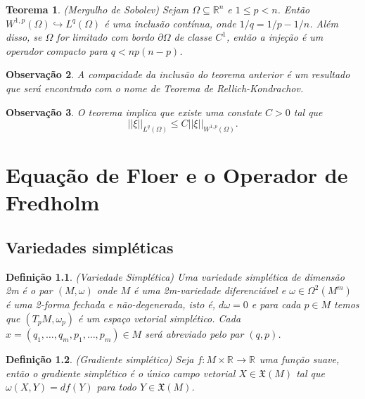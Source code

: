 \documentclass[12pt]{book}
\newtheorem{teorema}{Teorema}[section]
\newtheorem{definicao}[teorema]{Definição}
\newtheorem{observacao}[teorema]{Observação}
\newcommand{\espacoLpGeral}[2]{L^{#1}(#2)}
\newcommand{\espacosobolev}[1]{W^{1,p}(#1)}
\newcommand{\norma}[1]{||#1||}
\newcommand{\normaLgGeral}[3]{\norma{#1}_{\espacoLpGeral{#2}{#3}}}
\newcommand{\normaWpGeralDominio}[3]{\norma{#1}_{W^{1,#2}(#3)}}
\newcommand{\real}[1]{\mathbb{R}^{#1}}
\begin{document}
	\begin{teorema}\label{teorema_sobolev}
		(Mergulho de Sobolev) Sejam $\Omega \subseteq \real{n}$ e $1 \leq p < n$. Então $\espacosobolev{\Omega} \hookrightarrow L^{q}(\Omega)$ é uma inclusão contínua, onde $1/q = 1/p -1/n$. Além disso, se $\Omega$ for limitado com bordo $\partial\Omega$ de classe $C^{1}$, então a injeção é um operador compacto para $q<np(n-p)$.
	\end{teorema}
	
	\begin{observacao}
		A compacidade da inclusão do teorema anterior é um resultado que será encontrado com o nome de Teorema de Rellich-Kondrachov.
	\end{observacao}
	
	\begin{observacao}
		O teorema implica que existe uma constate $C>0$ tal que 
		$$
		\normaLgGeral{\xi}{q}{\Omega} \leq C \normaWpGeralDominio{\xi}{p}{\Omega}.
		$$
	\end{observacao}
	
	\chapter{Equação de Floer e o Operador de Fredholm}
	\section{Variedades simpléticas}
	\begin{definicao}
		(Variedade Simplética) Uma variedade simplética de dimensão 2m é o par $(M, \omega)$ onde $M$ é uma 2m-variedade diferenciável e $\omega \in \Omega^{2}(M^{m})$ é uma 2-forma fechada e não-degenerada, isto é, $d\omega = 0$ e para cada $p \in M$ temos que $(T_{p}M, \omega_{p})$ é um espaço vetorial simplético. Cada $x = (q_{1}, \dots, q_{m}, p_{1}, \dots, p_{m}) \in M$  será abreviado pelo par $(q,p)$.
	\end{definicao}
	
	\begin{definicao}
		(Gradiente simplético) Seja $f : M \times \real{} \to \real{}$ uma função suave, então o gradiente simplético é o único campo vetorial $X \in \mathfrak{X}(M)$ tal que $\omega(X, Y) = df(Y)$ para todo $Y \in \mathfrak{X}(M)$.
	\end{definicao}
	
\end{document}

